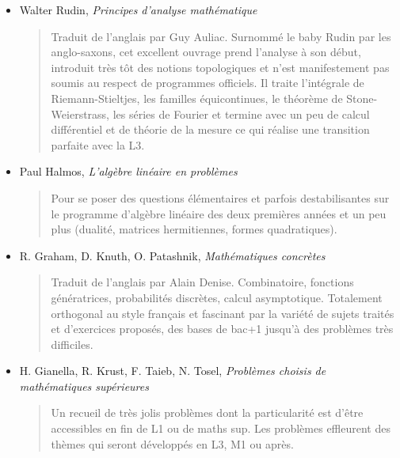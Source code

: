 \documentclass{article}
\begin{document}
\begin{itemize}
\item Walter Rudin, \emph{Principes d'analyse mathématique}
\begin{quote}
Traduit de l'anglais par Guy Auliac. Surnommé le \og baby Rudin\fg{} par les anglo-saxons, cet excellent ouvrage prend l'analyse à son début, introduit très tôt des notions topologiques et n'est manifestement pas soumis au respect de programmes officiels. Il traite l'intégrale de Riemann-Stieltjes, les familles équicontinues, le théorème de Stone-Weierstrass, les séries de Fourier et termine avec un peu de calcul différentiel et de théorie de la mesure ce qui réalise une transition parfaite avec la L3.
\end{quote}
\item Paul Halmos, \emph{L'algèbre linéaire en problèmes}
\begin{quote}
Pour se poser des questions élémentaires et parfois destabilisantes sur le programme d'algèbre linéaire des deux premières années et un peu plus (dualité, matrices hermitiennes, formes quadratiques).
\end{quote}
\item R. Graham, D. Knuth, O. Patashnik, \emph{Mathématiques concrètes}
\begin{quote}
Traduit de l'anglais par Alain Denise.
 Combinatoire, fonctions génératrices, probabilités discrètes, calcul asymptotique. Totalement orthogonal au style français et fascinant par la variété de sujets traités et d'exercices proposés, des bases de bac+1 jusqu'à des problèmes très difficiles.
\end{quote}
\item  H. Gianella, R. Krust, F. Taieb, N. Tosel, \emph{Problèmes choisis de mathématiques supérieures}
\begin{quote}
Un recueil de très jolis problèmes dont la particularité est d'être accessibles en fin de L1 ou de maths sup. Les problèmes effleurent des thèmes qui seront développés en L3, M1 ou après. %
\end{quote}

\end{itemize}
\end{document}
